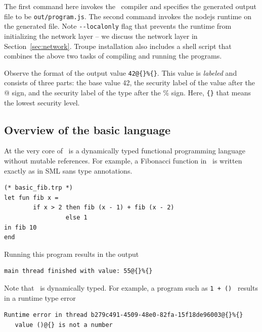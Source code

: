 The first command here invokes the \troupelang\ compiler and specifies the generated output file to be {\tt out/program.js}.
The second command invokes the nodejs runtime on the generated file. Note {\tt {-}{-}localonly} flag that
prevents the runtime from initializing the network layer -- we discuss the network layer in Section~\ref{sec:network}.
Troupe installation also includes a shell script  that combines the above two tasks of compiling
and running the programs.

Observe the format of the output value {\tt 42@\{\}\%\{\}}. This value is \emph{labeled} and consists of three
parts: the base value 42, the security label of the value after the @ sign,
and the security label of the type after the \% sign. Here,  {\tt \{\}} that means the lowest security level.


\subsection{Overview of the basic language}
At the very core of \troupelang\ is a dynamically typed functional programming language without mutable references.
For example, a Fibonacci function in \troupelang\ is written exactly as in SML sans type annotations.
\begin{lstlisting}
(* basic_fib.trp *)
let fun fib x =
        if x > 2 then fib (x - 1) + fib (x - 2)
                 else 1
in fib 10
end
\end{lstlisting}
Running this program results in the output
\begin{verbatim}
main thread finished with value: 55@{}%{}
\end{verbatim}

Note that \troupelang\ is dynamically typed. For example, a program such as {\tt 1 + () } results in a
runtime type error

\begin{verbatim}
Runtime error in thread b279c491-4509-48e0-82fa-15f18de96003@{}%{}
   value ()@{} is not a number
\end{verbatim}


